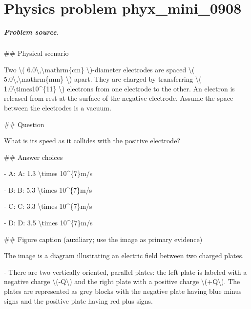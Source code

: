 
\chapter{Physics problem phyx\_mini\_0908}
\label{ch:PhyXMiniProblems_problem_phyx_mini_0908}

\paragraph{Problem source.}
\#\# Physical scenario

Two \textbackslash{}( 6.0\textbackslash{},\textbackslash{}mathrm\{cm\} \textbackslash{})-diameter electrodes are spaced \textbackslash{}( 5.0\textbackslash{},\textbackslash{}mathrm\{mm\} \textbackslash{}) apart. They are charged by transferring \textbackslash{}( 1.0\textbackslash{}times10\textasciicircum{}\{11\} \textbackslash{}) electrons from one electrode to the other. An electron is released from rest at the surface of the negative electrode. Assume the space between the electrodes is a vacuum.

\#\# Question

What is its speed as it collides with the positive electrode?

\#\# Answer choices

- A: A: 1.3 \textbackslash{}times 10\textasciicircum{}\{7\}m/s

- B: B: 5.3 \textbackslash{}times 10\textasciicircum{}\{7\}m/s

- C: C: 3.3 \textbackslash{}times 10\textasciicircum{}\{7\}m/s

- D: D: 3.5 \textbackslash{}times 10\textasciicircum{}\{7\}m/s

\#\# Figure caption (auxiliary; use the image as primary evidence)

The image is a diagram illustrating an electric field between two charged plates. 

- There are two vertically oriented, parallel plates: the left plate is labeled with a negative charge \textbackslash{}(-Q\textbackslash{}) and the right plate with a positive charge \textbackslash{}(+Q\textbackslash{}). The plates are represented as grey blocks with the negative plate having blue minus signs and the positive plate having red plus signs.

